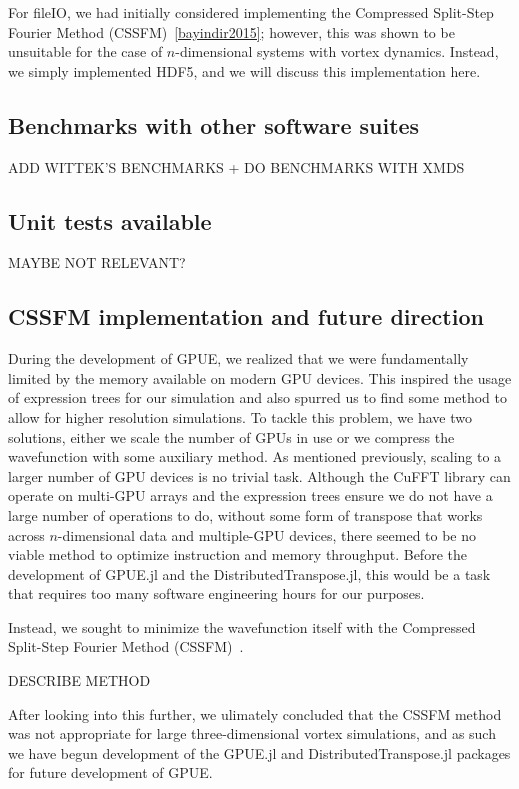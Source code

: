 For fileIO, we had initially considered implementing the Compressed Split-Step Fourier Method (CSSFM)~\ref{bayindir2015}; however, this was shown to be unsuitable for the case of $n$-dimensional systems with vortex dynamics.
Instead, we simply implemented HDF5, and we will discuss this implementation here.

\subsection{Benchmarks with other software suites}

ADD WITTEK'S BENCHMARKS + DO BENCHMARKS WITH XMDS

\subsection{Unit tests available}

MAYBE NOT RELEVANT?

\subsection{CSSFM implementation and future direction}
\label{sec:multiGPU}

During the development of GPUE, we realized that we were fundamentally limited by the memory available on modern GPU devices.
This inspired the usage of expression trees for our simulation and also spurred us to find some method to allow for higher resolution simulations.
To tackle this problem, we have two solutions, either we scale the number of GPUs in use or we compress the wavefunction with some auxiliary method.
As mentioned previously, scaling to a larger number of GPU devices is no trivial task.
Although the CuFFT library can operate on multi-GPU arrays and the expression trees ensure we do not have a large number of operations to do, without some form of transpose that works across $n$-dimensional data and multiple-GPU devices, there seemed to be no viable method to optimize instruction and memory throughput.
Before the development of GPUE.jl and the DistributedTranspose.jl, this would be a task that requires too many software engineering hours for our purposes.

Instead, we sought to minimize the wavefunction itself with the Compressed Split-Step Fourier Method (CSSFM)~\cite{bayindir2015}.

DESCRIBE METHOD

After looking into this further, we ulimately concluded that the CSSFM method was not appropriate for large three-dimensional vortex simulations, and as such we have begun development of the GPUE.jl and DistributedTranspose.jl packages for future development of GPUE.

